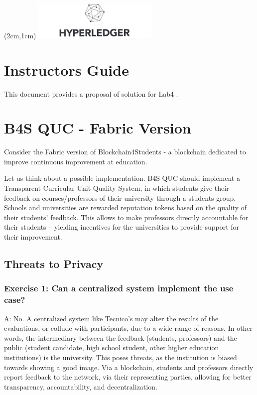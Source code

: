 \documentclass[12pt,a4paper]{article}
\begin{document}
\textblockorigin{-34pt}{-12pt}
\begin{textblock*}{10cm}(2cm,1cm)
\includegraphics[width=6cm]{hyperledger.png}
\end{textblock*}

\section*{Instructors Guide}
This document provides a proposal of solution for Lab4 \cite{belchior2019_audits}.




\section{B4S QUC - Fabric Version} 

Consider the Fabric version of Blockchain4Students - a blockchain dedicated to improve continuous improvement at education.

Let us think about a possible implementation. B4S QUC should implement a Transparent Curricular Unit Quality System, in which students give their feedback on courses/professors of their university through a students group. Schools and universities are rewarded reputation tokens based on the quality of their students' feedback. This allows to make professors directly accountable for their students -- yielding incentives for the universities to provide support for their improvement. 



\newtheorem{threat}{Threat}

\subsection{Threats to Privacy}



\subsubsection*{Exercise 1: Can a centralized system implement the use case?}

A: No. A centralized system like Tecnico's may alter the results of the evaluations, or collude with participants, due to a wide range of reasons. In other words, the intermediary between the feedback (students, professors) and the public (student candidate, high school student, other higher education institutions) is the university. This poses threats, as the institution is biased towards showing a good image. Via a blockchain, students and professors directly report feedback to the network, via their representing parties, allowing for better transparency, accountability, and decentralization.
\end{document}
